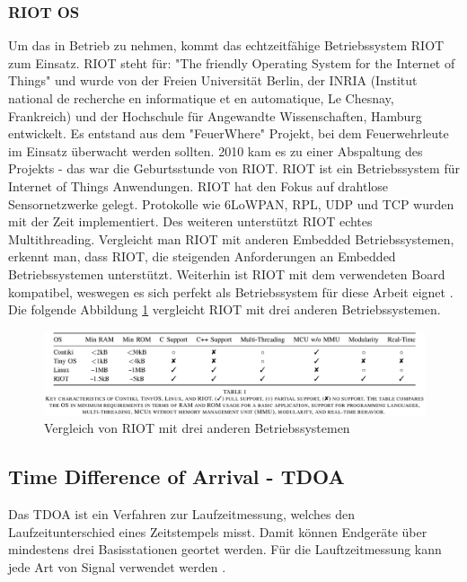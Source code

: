 \subsubsection{RIOT OS}
Um das \board \platz in Betrieb zu nehmen, kommt das echtzeitfähige Betriebssystem RIOT zum Einsatz. RIOT steht für: "The friendly Operating System for the Internet of Things" und wurde von der Freien Universität Berlin, der INRIA (Institut national de recherche en informatique et en automatique, Le Chesnay, Frankreich) und der Hochschule für Angewandte Wissenschaften, Hamburg entwickelt. Es entstand aus dem "FeuerWhere" Projekt, bei dem Feuerwehrleute im Einsatz überwacht werden sollten. 2010 kam es zu einer Abspaltung des Projekts - das war die Geburtsstunde von RIOT. RIOT ist ein Betriebssystem für Internet of Things Anwendungen. RIOT hat den Fokus auf drahtlose Sensornetzwerke gelegt. Protokolle wie 6LoWPAN, RPL, UDP und TCP wurden mit der Zeit implementiert. Des weiteren unterstützt RIOT echtes Multithreading. Vergleicht man RIOT mit anderen Embedded Betriebssystemen, erkennt man, dass RIOT, die steigenden Anforderungen an Embedded Betriebssystemen unterstützt. Weiterhin ist RIOT mit dem verwendeten Board \board \platz kompatibel, weswegen es sich perfekt als Betriebssystem für diese Arbeit eignet \cite{src_RIOT}. Die folgende Abbildung \ref{img:vergleich} vergleicht RIOT mit drei anderen Betriebssystemen.

\begin{figure}[H]
        \centering
		\hspace*{-1.5cm}
        \includegraphics[width=1.2\textwidth]{images/vergleich.png}
        \caption{Vergleich von RIOT mit drei anderen Betriebssystemen}
        \label{img:vergleich}
\end{figure}

\subsection{Time Difference of Arrival - TDOA}
Das TDOA ist ein Verfahren zur Laufzeitmessung, welches den Laufzeitunterschied eines Zeitstempels misst. Damit können Endgeräte über mindestens drei Basisstationen geortet werden. Für die Lauftzeitmessung kann jede Art von Signal verwendet werden \cite{src_TDOA}.

